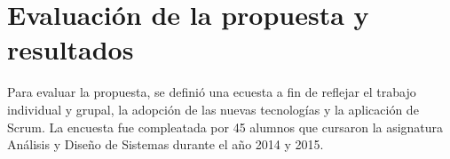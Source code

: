 \section{Evaluación de la propuesta y resultados}\label{resultado}
Para evaluar la propuesta, se definió una ecuesta a fin de reflejar el trabajo individual y grupal, la adopción de las nuevas tecnologías y
la aplicación de Scrum. La encuesta fue compleatada por 45 alumnos que cursaron la asignatura Análisis y Diseño de Sistemas durante el año
 2014 y 2015. 





   